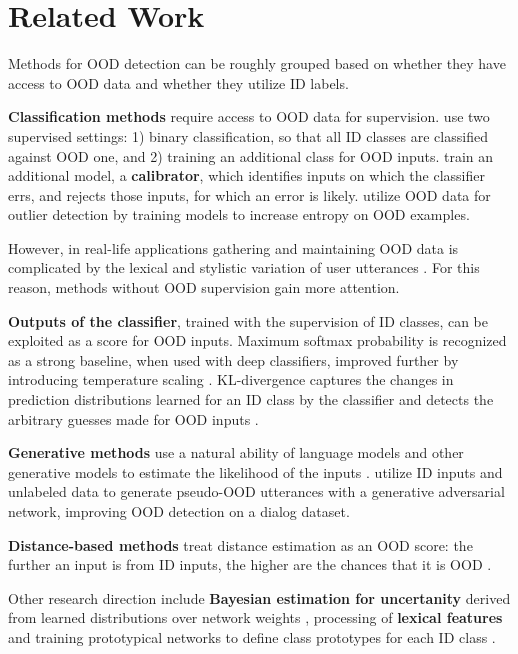 \documentclass[letterpaper, final]{article} %
\begin{document}
\section{Related Work}

Methods for OOD detection can be roughly grouped based on whether they have access to OOD data and whether they utilize ID labels. 

{\bf Classification methods} require access to OOD data for supervision.  \citet{larson2019evaluation} use two supervised settings: 1) binary classification, so that all ID classes are classified against OOD one, and 2) training an additional class for OOD inputs.
\cite{kamath2020selective} train an additional model,  a {\bf calibrator}, which identifies inputs on which the classifier errs, and rejects those inputs, for which an error is likely. \cite{hendrycks2018deep_OE}  utilize OOD data for outlier detection by training models to increase entropy on OOD examples.

However, in real-life applications gathering and maintaining OOD data is complicated by the lexical and stylistic variation of user utterances \cite{rostd_indomain}. For this reason, methods without OOD supervision gain more attention.  


{\bf Outputs of the classifier},
trained with the supervision of ID classes, can be exploited as a score for OOD inputs. Maximum softmax probability  \cite{msp}  is recognized as a strong baseline, when used with deep classifiers, improved further by introducing temperature scaling \cite{odin}. KL-divergence captures the changes in prediction distributions learned for an ID class by the classifier and detects the arbitrary guesses made for OOD inputs \cite{yilmaz2020kloos}. 


{\bf Generative methods} use a natural ability of language models and other generative models to estimate the likelihood of the inputs \cite{nalisnick2018do,ll_ratio_google}. \cite{zheng2020out} utilize ID inputs and unlabeled data to generate pseudo-OOD utterances with a generative adversarial network, improving  OOD detection on a dialog dataset.

{\bf Distance-based methods} treat distance estimation as an OOD score: the further an input is from ID inputs, the higher are the chances that it is OOD \cite{Mandelbaum2017DistancebasedCS,Gu2019StatisticalAO,Lee2018ASU}.  


Other research direction include  {\bf Bayesian estimation for uncertanity} derived from learned distributions over network weights  \cite{NIPS2018_7936, blundell2015weight}, processing of {\bf lexical features} \cite{ghosal2018investigating} and training prototypical networks  to define class prototypes for each ID class \cite{tan2019out}. 
\end{document}
